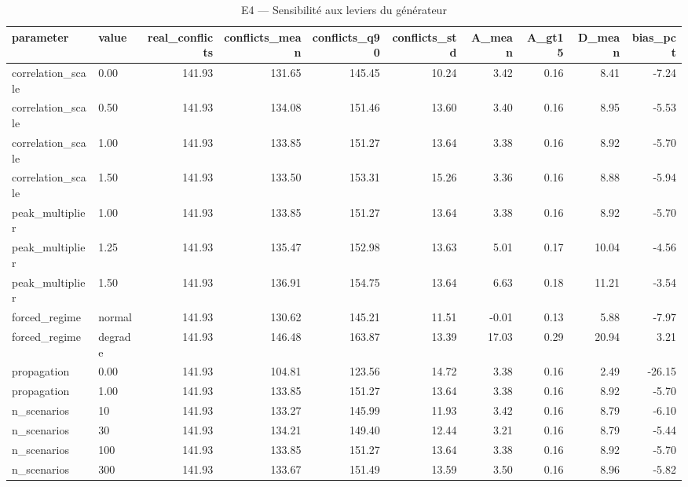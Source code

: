 \begin{table}
\caption{E4 — Sensibilité aux leviers du générateur}
\label{tab:T4}
\begin{tabular}{llrrrrrrrr}
\toprule
parameter & value & real\_conflicts & conflicts\_mean & conflicts\_q90 & conflicts\_std & A\_mean & A\_gt15 & D\_mean & bias\_pct \\
\midrule
correlation\_scale & 0.00 & 141.93 & 131.65 & 145.45 & 10.24 & 3.42 & 0.16 & 8.41 & -7.24 \\
correlation\_scale & 0.50 & 141.93 & 134.08 & 151.46 & 13.60 & 3.40 & 0.16 & 8.95 & -5.53 \\
correlation\_scale & 1.00 & 141.93 & 133.85 & 151.27 & 13.64 & 3.38 & 0.16 & 8.92 & -5.70 \\
correlation\_scale & 1.50 & 141.93 & 133.50 & 153.31 & 15.26 & 3.36 & 0.16 & 8.88 & -5.94 \\
peak\_multiplier & 1.00 & 141.93 & 133.85 & 151.27 & 13.64 & 3.38 & 0.16 & 8.92 & -5.70 \\
peak\_multiplier & 1.25 & 141.93 & 135.47 & 152.98 & 13.63 & 5.01 & 0.17 & 10.04 & -4.56 \\
peak\_multiplier & 1.50 & 141.93 & 136.91 & 154.75 & 13.64 & 6.63 & 0.18 & 11.21 & -3.54 \\
forced\_regime & normal & 141.93 & 130.62 & 145.21 & 11.51 & -0.01 & 0.13 & 5.88 & -7.97 \\
forced\_regime & degrade & 141.93 & 146.48 & 163.87 & 13.39 & 17.03 & 0.29 & 20.94 & 3.21 \\
propagation & 0.00 & 141.93 & 104.81 & 123.56 & 14.72 & 3.38 & 0.16 & 2.49 & -26.15 \\
propagation & 1.00 & 141.93 & 133.85 & 151.27 & 13.64 & 3.38 & 0.16 & 8.92 & -5.70 \\
n\_scenarios & 10 & 141.93 & 133.27 & 145.99 & 11.93 & 3.42 & 0.16 & 8.79 & -6.10 \\
n\_scenarios & 30 & 141.93 & 134.21 & 149.40 & 12.44 & 3.21 & 0.16 & 8.79 & -5.44 \\
n\_scenarios & 100 & 141.93 & 133.85 & 151.27 & 13.64 & 3.38 & 0.16 & 8.92 & -5.70 \\
n\_scenarios & 300 & 141.93 & 133.67 & 151.49 & 13.59 & 3.50 & 0.16 & 8.96 & -5.82 \\
\bottomrule
\end{tabular}
\end{table}
